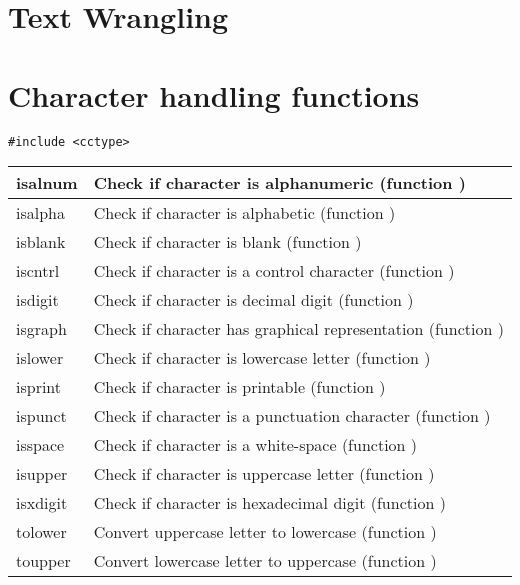 \documentclass{article}
\begin{document}
\section{Text Wrangling}
\section*{Character handling functions}
\begin{verbatim}
#include <cctype>
\end{verbatim}
\begin{tabular}{|l|l|}
\hline
isalnum & Check if character is alphanumeric (function )\\ 
 \hline 
isalpha & Check if character is alphabetic (function )\\ 
 \hline 
isblank & Check if character is blank (function )\\ 
 \hline 
iscntrl & Check if character is a control character (function )\\ 
 \hline 
isdigit & Check if character is decimal digit (function )\\ 
 \hline 
isgraph & Check if character has graphical representation (function )\\ 
 \hline 
islower & Check if character is lowercase letter (function )\\ 
 \hline 
isprint & Check if character is printable (function )\\ 
 \hline 
ispunct & Check if character is a punctuation character (function )\\ 
 \hline 
isspace & Check if character is a white-space (function )\\ 
 \hline 
isupper & Check if character is uppercase letter (function )\\ 
 \hline 
isxdigit & Check if character is hexadecimal digit (function )\\ 
 \hline 
tolower & Convert uppercase letter to lowercase (function )\\ 
 \hline 
toupper & Convert lowercase letter to uppercase (function ) \\
\hline
\end{tabular}
\end{document}
